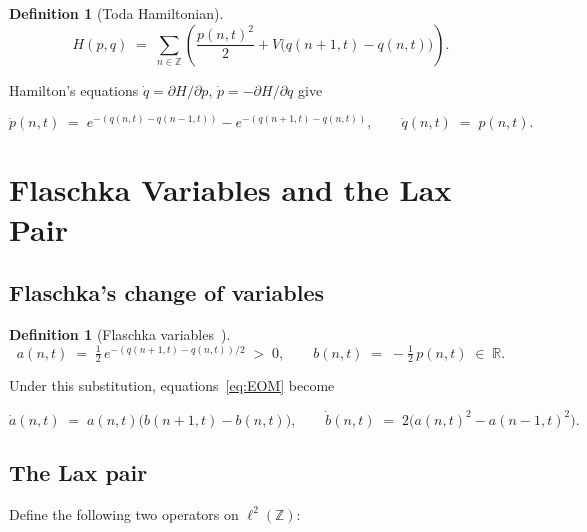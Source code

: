 \documentclass[12pt,a4paper]{article}
\newtheorem{definition}[theorem]{Definition}
\theoremstyle{definition}
\newcommand{\R}{\mathbb{R}}
\newcommand{\Z}{\mathbb{Z}}
\begin{document}
\begin{definition}[Toda Hamiltonian]
\begin{equation}\label{eq:Ham}
  H(p,q) \;=\; \sum_{n\in\Z}
    \left(\frac{p(n,t)^{2}}{2} + V\!\bigl(q(n+1,t)-q(n,t)\bigr)\right).
\end{equation}
\end{definition}

Hamilton's equations $\dot{q}=\partial H/\partial p$,
$\dot{p}=-\partial H/\partial q$ give

\begin{equation}\label{eq:EOM}
\boxed{
  \dot{p}(n,t) \;=\; e^{-(q(n,t)-q(n-1,t))} - e^{-(q(n+1,t)-q(n,t))},
  \qquad
  \dot{q}(n,t) \;=\; p(n,t).}
\end{equation}

\section{Flaschka Variables and the Lax Pair}

\subsection{Flaschka's change of variables}

\begin{definition}[Flaschka variables~\cite{Flaschka1974,Manakov1974}]
\begin{equation}\label{eq:Flaschka}
  a(n,t) \;=\; \tfrac{1}{2}\,e^{-(q(n+1,t)-q(n,t))/2} \;>\; 0,
  \qquad
  b(n,t) \;=\; -\tfrac{1}{2}\,p(n,t) \;\in\;\R.
\end{equation}
\end{definition}

Under this substitution, equations~\eqref{eq:EOM} become

\begin{equation}\label{eq:TodaFlaschka}
  \dot{a}(n,t) \;=\; a(n,t)\bigl(b(n+1,t)-b(n,t)\bigr),
  \qquad
  \dot{b}(n,t) \;=\; 2\bigl(a(n,t)^{2} - a(n-1,t)^{2}\bigr).
\end{equation}

\subsection{The Lax pair}

Define the following two operators on $\ell^{2}(\Z)$:
\end{document}

